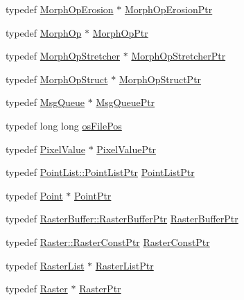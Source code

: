 \begin{DoxyCompactItemize}
\item 
typedef \hyperlink{class_k_k_b_1_1_morph_op_erosion}{Morph\+Op\+Erosion} $\ast$ \hyperlink{namespace_k_k_b_a429fb7abf87310aa55e71a81453a2e9d}{Morph\+Op\+Erosion\+Ptr}
\item 
typedef \hyperlink{class_k_k_b_1_1_morph_op}{Morph\+Op} $\ast$ \hyperlink{namespace_k_k_b_a69151b45e9d13bdbf877bbb90894d419}{Morph\+Op\+Ptr}
\item 
typedef \hyperlink{class_k_k_b_1_1_morph_op_stretcher}{Morph\+Op\+Stretcher} $\ast$ \hyperlink{namespace_k_k_b_af9cdcbd4f5d01cffe65a6f9b9e0ba4c8}{Morph\+Op\+Stretcher\+Ptr}
\item 
typedef \hyperlink{class_k_k_b_1_1_morph_op_struct}{Morph\+Op\+Struct} $\ast$ \hyperlink{namespace_k_k_b_a157f40c2d48ae3f1f80b2a2b48a44e51}{Morph\+Op\+Struct\+Ptr}
\item 
typedef \hyperlink{class_k_k_b_1_1_msg_queue}{Msg\+Queue} $\ast$ \hyperlink{namespace_k_k_b_aaa43074273f12ed325a053d9e1faf84a}{Msg\+Queue\+Ptr}
\item 
typedef long long \hyperlink{namespace_k_k_b_a18d02cabaafac3bd64feb89b1fa02afa}{os\+File\+Pos}
\item 
typedef \hyperlink{class_k_k_b_1_1_pixel_value}{Pixel\+Value} $\ast$ \hyperlink{namespace_k_k_b_a7d98bc067fba7ce9b3ad4ecf4031cccf}{Pixel\+Value\+Ptr}
\item 
typedef \hyperlink{class_k_k_b_1_1_point_list_af5058320a40be067bf73c2d78ff8b35d}{Point\+List\+::\+Point\+List\+Ptr} \hyperlink{namespace_k_k_b_ad6b8056511ec9a218dd5ef30b57d1415}{Point\+List\+Ptr}
\item 
typedef \hyperlink{class_k_k_b_1_1_point}{Point} $\ast$ \hyperlink{namespace_k_k_b_a7ad8f8714e7458f91202e9e758fdde21}{Point\+Ptr}
\item 
typedef \hyperlink{class_k_k_b_1_1_raster_buffer_a1dc33d464c891b33bf9cf582d072d070}{Raster\+Buffer\+::\+Raster\+Buffer\+Ptr} \hyperlink{namespace_k_k_b_afa8bd43b3a637005b458f44102e99724}{Raster\+Buffer\+Ptr}
\item 
typedef \hyperlink{class_k_k_b_1_1_raster_ad76aea7ccc94ebd88384a43aa1a19394}{Raster\+::\+Raster\+Const\+Ptr} \hyperlink{namespace_k_k_b_a5acfa7402dc4df1769f90d3dc8ddfc2c}{Raster\+Const\+Ptr}
\item 
typedef \hyperlink{class_k_k_b_1_1_raster_list}{Raster\+List} $\ast$ \hyperlink{namespace_k_k_b_a5369c086484e7d77bcb87b0b8aa7193d}{Raster\+List\+Ptr}
\item 
typedef \hyperlink{class_k_k_b_1_1_raster}{Raster} $\ast$ \hyperlink{namespace_k_k_b_a80d46bd24db644a022c863bce8ae3633}{Raster\+Ptr}

\end{DoxyCompactItemize}
